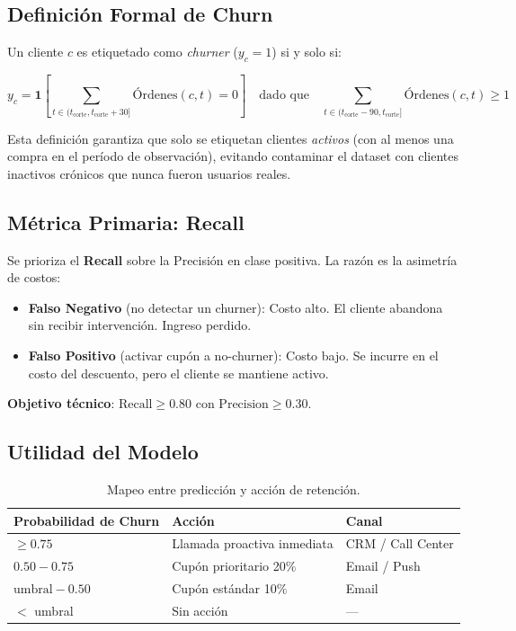 \documentclass[12pt, letterpaper]{article}
\begin{document}
\subsection{Definición Formal de Churn}

Un cliente $c$ es etiquetado como \textit{churner} ($y_c = 1$) si y solo si:

\begin{equation}
y_c = \mathbf{1}\left[\sum_{t \in (t_{\text{corte}}, t_{\text{corte}} + 30]} \text{Órdenes}(c, t) = 0\right]
\quad \text{dado que} \quad \sum_{t \in (t_{\text{corte}}-90, t_{\text{corte}}]} \text{Órdenes}(c, t) \geq 1
\label{eq:churn_def}
\end{equation}

Esta definición garantiza que solo se etiquetan clientes \textit{activos}
(con al menos una compra en el período de observación), evitando contaminar
el dataset con clientes inactivos crónicos que nunca fueron usuarios reales.

\subsection{Métrica Primaria: Recall}

\begin{tcolorbox}[colback=churnred!8, colframe=churnred, title={Justificación de la Métrica Primaria}]
Se prioriza el \textbf{Recall} sobre la Precisión en clase positiva. La
razón es la asimetría de costos:
\begin{itemize}
  \item \textbf{Falso Negativo} (no detectar un churner): Costo alto.
    El cliente abandona sin recibir intervención. Ingreso perdido.
  \item \textbf{Falso Positivo} (activar cupón a no-churner): Costo bajo.
    Se incurre en el costo del descuento, pero el cliente se mantiene activo.
\end{itemize}
\textbf{Objetivo técnico}: $\text{Recall} \geq 0.80$ con $\text{Precision} \geq 0.30$.
\end{tcolorbox}

\subsection{Utilidad del Modelo}

\begin{table}[H]
\centering
\caption{Mapeo entre predicción y acción de retención.}
\label{tab:actions}
\begin{tabular}{lll}
\toprule
\textbf{Probabilidad de Churn} & \textbf{Acción} & \textbf{Canal} \\
\midrule
$\geq 0.75$ & Llamada proactiva inmediata & CRM / Call Center \\
$0.50-0.75$ & Cupón prioritario 20\% & Email / Push \\
$\text{umbral}-0.50$ & Cupón estándar 10\% & Email \\
$<$ umbral & Sin acción & — \\
\bottomrule
\end{tabular}
\end{table}
\end{document}
